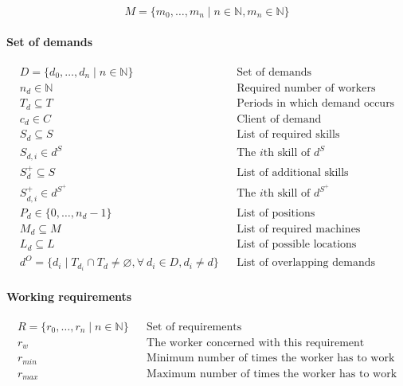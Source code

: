 \documentclass[../../thesis.tex]{subfiles}
\begin{document}
\begin{equation*}
  M = \{ m_0, \dots, m_n \mid n \in \mathbb{N}, m_n \in \mathbb{N} \}
\end{equation*}


\paragraph{Set of demands}

\begin{align*}
  D = \{ d_0, \dots, d_n \mid n \in \mathbb{N} \} && \text{Set of demands} \\
  n_d \in \mathbb{N} && \text{Required number of workers} \\ 
  T_d \subseteq T && \text{Periods in which demand occurs} \\ 
  c_d \in C && \text{Client of demand} \\ 
  S_d \subseteq S && \text{List of required skills} \\
  S_{d,i} \in d^S && \text{The $i$th skill of $d^S$} \\ 
  S^{+}_d \subseteq S && \text{List of additional skills} \\ 
  S^{+}_{d,i} \in d^{S^+} && \text{The $i$th skill of $d^{S^+}$} \\ 
  P_d \in \{ 0, \dots, n_d - 1 \} && \text{List of positions} \\
  M_d \subseteq M && \text{List of required machines} \\ 
  L_d \subseteq L && \text{List of possible locations} \\
  d^O = \{ d_i \mid T_{d_i} \cap T_d \neq \varnothing, \forall \ d_i \in D, d_i \neq d \} && \text{List of overlapping demands}
\end{align*}

\paragraph{Working requirements}

\begin{align*}
    R = \{ r_0, \dots, r_n \mid n \in \mathbb{N} \} && \text{Set of requirements} \\ 
    r_{w}   && \text{The worker concerned with this requirement} \\
    r_{min} && \text{Minimum number of times the worker has to work} \\
    r_{max} && \text{Maximum number of times the worker has to work}
\end{align*}
\end{document}
